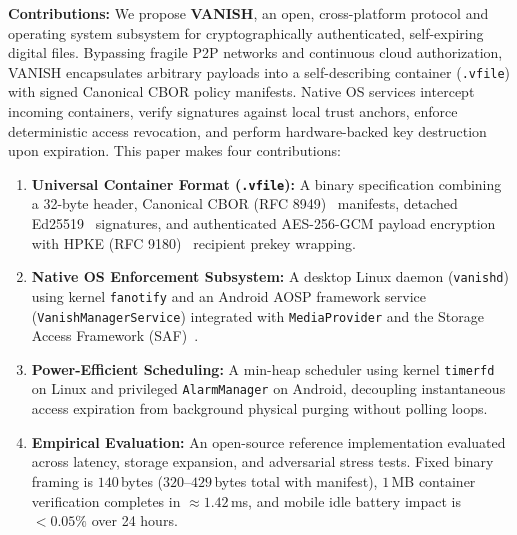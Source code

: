\textbf{Contributions:} We propose \textbf{VANISH}, an open, cross-platform protocol and operating system subsystem for cryptographically authenticated, self-expiring digital files. Bypassing fragile P2P networks and continuous cloud authorization, VANISH encapsulates arbitrary payloads into a self-describing container (\texttt{.vfile}) with signed Canonical CBOR policy manifests. Native OS services intercept incoming containers, verify signatures against local trust anchors, enforce deterministic access revocation, and perform hardware-backed key destruction upon expiration. This paper makes four contributions:
\begin{enumerate}
    \item \textbf{Universal Container Format (\texttt{.vfile}):} A binary specification combining a 32-byte header, Canonical CBOR (RFC 8949)~\cite{rfc8949cbor} manifests, detached Ed25519~\cite{brendel2021provable} signatures, and authenticated AES-256-GCM payload encryption with HPKE (RFC 9180)~\cite{rfc9180hpke} recipient prekey wrapping.
    \item \textbf{Native OS Enforcement Subsystem:} A desktop Linux daemon (\texttt{vanishd}) using kernel \texttt{fanotify} and an Android AOSP framework service (\texttt{VanishManagerService}) integrated with \texttt{MediaProvider} and the Storage Access Framework (SAF)~\cite{android_scoped_storage, smalley2013security}.
    \item \textbf{Power-Efficient Scheduling:} A min-heap scheduler using kernel \texttt{timerfd} on Linux and privileged \texttt{AlarmManager} on Android, decoupling instantaneous access expiration from background physical purging without polling loops.
    \item \textbf{Empirical Evaluation:} An open-source reference implementation evaluated across latency, storage expansion, and adversarial stress tests. Fixed binary framing is $140$\,bytes ($320$--$429$\,bytes total with manifest), $1$\,MB container verification completes in $\approx 1.42$\,ms, and mobile idle battery impact is $<0.05\%$ over 24 hours.
\end{enumerate}
